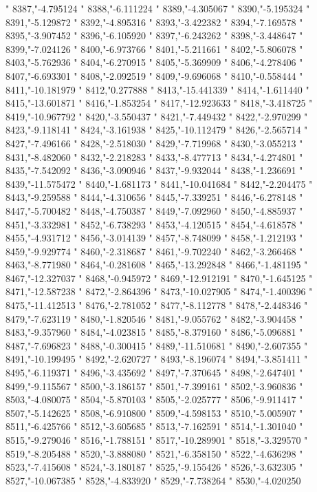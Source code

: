 "
8387,"-4.795124
"
8388,"-6.111224
"
8389,"-4.305067
"
8390,"-5.195324
"
8391,"-5.129872
"
8392,"-4.895316
"
8393,"-3.422382
"
8394,"-7.169578
"
8395,"-3.907452
"
8396,"-6.105920
"
8397,"-6.243262
"
8398,"-3.448647
"
8399,"-7.024126
"
8400,"-6.973766
"
8401,"-5.211661
"
8402,"-5.806078
"
8403,"-5.762936
"
8404,"-6.270915
"
8405,"-5.369909
"
8406,"-4.278406
"
8407,"-6.693301
"
8408,"-2.092519
"
8409,"-9.696068
"
8410,"-0.558444
"
8411,"-10.181979
"
8412,"0.277888
"
8413,"-15.441339
"
8414,"-1.611440
"
8415,"-13.601871
"
8416,"-1.853254
"
8417,"-12.923633
"
8418,"-3.418725
"
8419,"-10.967792
"
8420,"-3.550437
"
8421,"-7.449432
"
8422,"-2.970299
"
8423,"-9.118141
"
8424,"-3.161938
"
8425,"-10.112479
"
8426,"-2.565714
"
8427,"-7.496166
"
8428,"-2.518030
"
8429,"-7.719968
"
8430,"-3.055213
"
8431,"-8.482060
"
8432,"-2.218283
"
8433,"-8.477713
"
8434,"-4.274801
"
8435,"-7.542092
"
8436,"-3.090946
"
8437,"-9.932044
"
8438,"-1.236691
"
8439,"-11.575472
"
8440,"-1.681173
"
8441,"-10.041684
"
8442,"-2.204475
"
8443,"-9.259588
"
8444,"-4.310656
"
8445,"-7.339251
"
8446,"-6.278148
"
8447,"-5.700482
"
8448,"-4.750387
"
8449,"-7.092960
"
8450,"-4.885937
"
8451,"-3.332981
"
8452,"-6.738293
"
8453,"-4.120515
"
8454,"-4.618578
"
8455,"-4.931712
"
8456,"-3.014139
"
8457,"-8.748099
"
8458,"-1.212193
"
8459,"-9.929774
"
8460,"-2.318687
"
8461,"-9.702240
"
8462,"-3.266468
"
8463,"-8.771980
"
8464,"-0.281608
"
8465,"-13.292848
"
8466,"-1.481195
"
8467,"-12.327037
"
8468,"-0.945972
"
8469,"-12.912191
"
8470,"-1.645125
"
8471,"-12.587238
"
8472,"-2.864396
"
8473,"-10.027905
"
8474,"-1.400396
"
8475,"-11.412513
"
8476,"-2.781052
"
8477,"-8.112778
"
8478,"-2.448346
"
8479,"-7.623119
"
8480,"-1.820546
"
8481,"-9.055762
"
8482,"-3.904458
"
8483,"-9.357960
"
8484,"-4.023815
"
8485,"-8.379160
"
8486,"-5.096881
"
8487,"-7.696823
"
8488,"-0.300415
"
8489,"-11.510681
"
8490,"-2.607355
"
8491,"-10.199495
"
8492,"-2.620727
"
8493,"-8.196074
"
8494,"-3.851411
"
8495,"-6.119371
"
8496,"-3.435692
"
8497,"-7.370645
"
8498,"-2.647401
"
8499,"-9.115567
"
8500,"-3.186157
"
8501,"-7.399161
"
8502,"-3.960836
"
8503,"-4.080075
"
8504,"-5.870103
"
8505,"-2.025777
"
8506,"-9.911417
"
8507,"-5.142625
"
8508,"-6.910800
"
8509,"-4.598153
"
8510,"-5.005907
"
8511,"-6.425766
"
8512,"-3.605685
"
8513,"-7.162591
"
8514,"-1.301040
"
8515,"-9.279046
"
8516,"-1.788151
"
8517,"-10.289901
"
8518,"-3.329570
"
8519,"-8.205488
"
8520,"-3.888080
"
8521,"-6.358150
"
8522,"-4.636298
"
8523,"-7.415608
"
8524,"-3.180187
"
8525,"-9.155426
"
8526,"-3.632305
"
8527,"-10.067385
"
8528,"-4.833920
"
8529,"-7.738264
"
8530,"-4.020250
